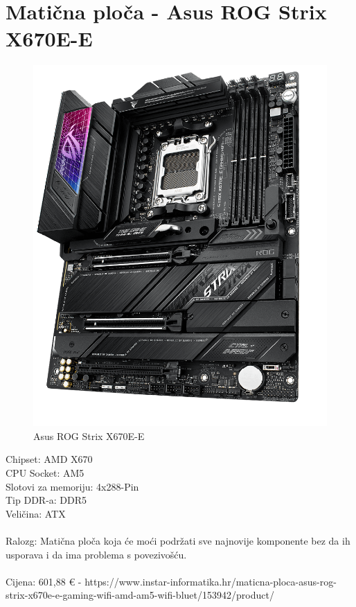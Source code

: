 \documentclass{report}
\begin{document}
\section{Matična ploča - Asus ROG Strix X670E-E}
\begin{figure}[H]
    \centering
    \includegraphics[scale=0.2]{Slike/ROG-Strix-X670E-E-Gaming.png}
    \caption{Asus ROG Strix X670E-E}
    \label{fig:Maticna}
\end{figure}
Chipset: AMD X670\\CPU Socket: AM5\\Slotovi za memoriju: 4x288-Pin\\Tip DDR-a: DDR5\\ Veličina: ATX\\\\Ralozg: Matična ploča koja će moći podržati sve najnovije komponente bez da ih usporava i da ima problema s povezivošću.\\\\Cijena: 601,88 € - https://www.instar-informatika.hr/maticna-ploca-asus-rog-strix-x670e-e-gaming-wifi-amd-am5-wifi-bluet/153942/product/
\end{document}
